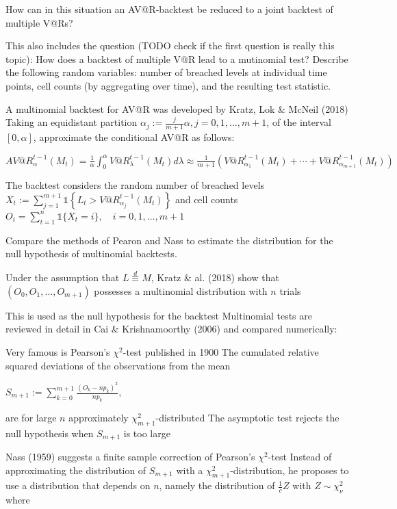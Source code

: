 How can in this situation an AV@R-backtest be reduced to a joint backtest of
multiple V@Rs?

This also includes the question (TODO check if the first question is really this topic):
How does a backtest of multiple V@R lead to a mutinomial test? Describe the
following random variables: number of breached levels at individual time points,
cell counts (by aggregating over time), and the resulting test statistic.

A multinomial backtest for AV@R was developed by Kratz, Lok & McNeil (2018)
Taking an equidistant partition \(\alpha_j := \frac{j}{m+1}\alpha, j = 0, 1, \ldots, m+1\), 
of the interval \([0, \alpha]\), approximate the conditional AV@R as follows:

\(
AV@R_{\alpha}^{t-1}(M_t) = \frac{1}{\alpha} \int_0^{\alpha} V@R_{\lambda}^{t-1}(M_t) d\lambda
\approx \frac{1}{m+1} \left( V@R_{\alpha_1}^{t-1}(M_t) + \cdots + V@R_{\alpha_{m+1}}^{t-1}(M_t) \right)
\)

The backtest considers the random number of breached levels
\(
X_t := \sum_{j=1}^{m+1} \mathbb{1} \left\{ L_t > V@R_{\alpha_j}^{t-1}(M_t) \right\}
\)
and cell counts
\(
O_i = \sum_{t=1}^{n} \mathbb{1} \{ X_t = i \}, \quad i = 0, 1, \ldots, m+1
\)

Compare the methods of Pearon and Nass to estimate the distribution for the null hypothesis 
of multinomial backtests.

Under the assumption that \( L \overset{d}{\equiv} M \), Kratz & al. (2018) show that
\((O_0, O_1, \ldots, O_{m+1})\)
possesses a multinomial distribution with \( n \) trials

This is used as the null hypothesis for the backtest
Multinomial tests are reviewed in detail in Cai & Krishnamoorthy (2006) and compared numerically:

Very famous is Pearson's \(\chi^2\)-test published in 1900
The cumulated relative squared deviations of the observations from the mean

\(
S_{m+1} := \sum_{k=0}^{m+1} \frac{(O_k - np_k)^2}{np_k},
\)

are for large \( n \) approximately \(\chi^2_{m+1}\)-distributed
The asymptotic test rejects the null hypothesis when \( S_{m+1} \) is too large

Nass (1959) suggests a finite sample correction of Pearson's \(\chi^2\)-test
Instead of approximating the distribution of \(S_{m+1}\) with a \(\chi^2_{m+1}\)-distribution, he proposes to use a distribution that depends on \(n\), namely the distribution of \(\frac{1}{c}Z\) with \(Z \sim \chi^2_{\nu}\) where

